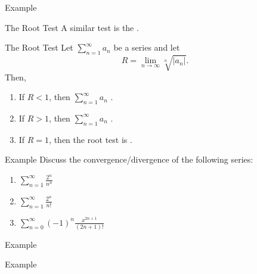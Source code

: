 \documentclass[presentation]{beamer}
\begin{document}
\begin{frame}[label={sec:org843e1d6}]{Example}
\end{frame}

\begin{frame}[label={sec:orgf4a6eb5}]{The Root Test}
A similar test is the \uline{\hspace*{1in}}.

\begin{block}{The Root Test}
Let \(\sum\limits_{n=1}^{\infty}a_n\) be a series and let
\[R = \lim_{n\rightarrow \infty} \sqrt[n]{\left| a_n \right|}.\]
Then,
\begin{enumerate}
\item If \(R < 1\), then \(\sum\limits_{n=1}^{\infty} a_n\) \uline{\hspace*{2in}}.
\item If \(R > 1\), then \(\sum\limits_{n=1}^{\infty} a_n\) \uline{\hspace*{1in}}.
\item If \(R = 1\), then the root test is \uline{\hspace*{1in}}.
\end{enumerate}
\end{block}
\end{frame}

\begin{frame}[label={sec:org4ea37a0}]{Example}
Discuss the convergence/divergence of the following series:
\begin{enumerate}
\item \(\sum\limits_{n=1}^{\infty} \frac{2^n}{n^n}\)
\item \(\sum\limits_{n=1}^{\infty} \frac{2^n}{n!}\)
\item \(\sum\limits_{n=0}^{\infty} \left( -1 \right)^n \frac{x^{2n+1}}{(2n+1)!}\)
\vspace{10in}
\end{enumerate}
\end{frame}

\begin{frame}[label={sec:orga8edbd4}]{Example}
\end{frame}

\begin{frame}[label={sec:org8dfd313}]{Example}
\end{frame}
\end{document}
